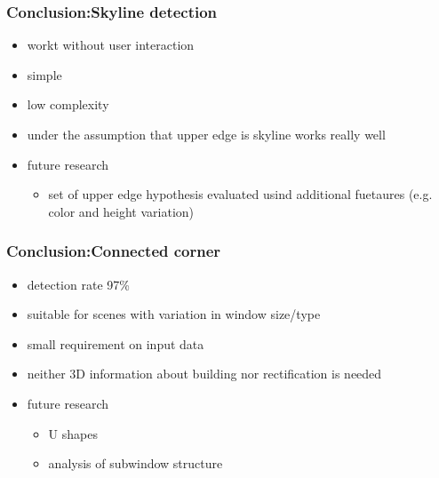 \documentclass{beamer}
\begin{document}
\frame
{
}

\frame
{
}

\frame
{
	\frametitle{Conclusion:Skyline detection}
	\begin{itemize}
	\item workt without user interaction
	\item simple
	\item low complexity
	\item under the assumption that upper edge is skyline works really well
	\item future research
		\begin{itemize}
		\item set of upper edge hypothesis evaluated usind additional fuetaures
		(e.g. color and height variation)
		\end{itemize}
	\end{itemize}
		
}

\frame
{
	\frametitle{Conclusion:Connected corner}
	\begin{itemize}
	\item detection rate 97\%
	\item suitable for scenes with variation in window size/type
	\item small requirement on input data
		\item neither 3D information about building nor rectification is needed
	\item future research
		\begin{itemize}			
		\item U shapes 
		\item analysis of subwindow structure
		\end{itemize}			
	\end{itemize}
}
\end{document}
